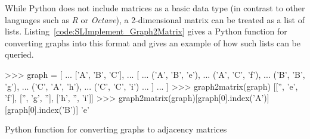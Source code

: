 %
While Python does not include matrices as a basic data type (in contrast to other languages such as \emph{R} or \emph{Octave}), a 2-dimensional matrix can be treated as a list of lists.
Listing~\ref{code:SLImplement_Graph2Matrix} gives a Python function for converting graphs into this format and gives an example of how such lists can be queried.
%
\begin{listing}[tbph]

\medskip
\begin{pythoncode}
    >>> graph = [
    ...     ['A', 'B', 'C'],
    ...     [
    ...         ('A', 'B', 'e'),
    ...         ('A', 'C', 'f'),
    ...         ('B', 'B', 'g'),
    ...         ('C', 'A', 'h'),
    ...         ('C', 'C', 'i')
    ...     ]
    ... ]
    >>> graph2matrix(graph)
    [['', 'e', 'f'], ['', 'g', ''], ['h', '', 'i']]
    >>> graph2matrix(graph)[graph[0].index('A')][graph[0].index('B')]
    'e'
\end{pythoncode}
\caption{Python function for converting graphs to adjacency matrices}
\label{code:SLImplement_Graph2Matrix}
\end{listing}

